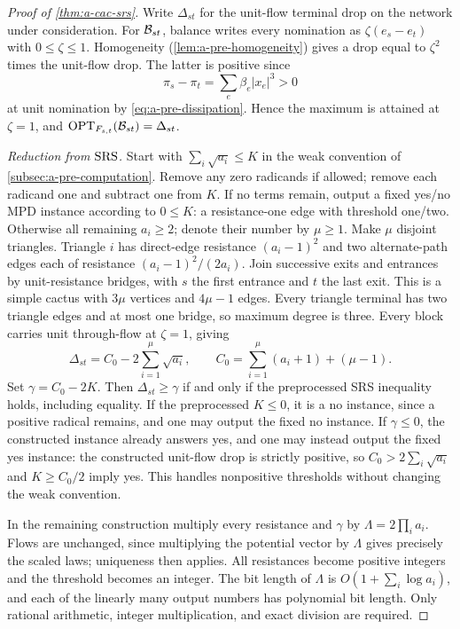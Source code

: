 \begin{proof}[Proof of \cref{thm:a-cac-srs}]
Write $\Delta_{st}$ for the unit-flow terminal drop on the network under
consideration. For $\mathcal{B}_{st}$, balance writes every nomination
as $\zeta(e_s-e_t)$ with $0\le \zeta\le1$. Homogeneity
(\cref{lem:a-pre-homogeneity}) gives a drop equal to $\zeta^2$ times the
unit-flow drop. The latter is positive since
\[
 \pi_s-\pi_t=\sum_e\beta_e|x_e|^3>0
\]
at unit nomination by \cref{eq:a-pre-dissipation}. Hence the maximum
is attained at $\zeta=1$, and
$\mathrm{OPT}_{F_{s,t}}(\mathcal{B}_{st})=\Delta_{st}$.

\emph{Reduction from $\mathrm{SRS}$.}
Start with $\sum_i\sqrt{a_i}\le K$ in the weak convention of
\cref{subsec:a-pre-computation}. Remove any zero radicands if allowed;
remove each radicand one and subtract one from $K$. If no terms
remain, output a fixed yes/no MPD instance according to $0\le K$:
a resistance-one edge with threshold one/two. Otherwise all remaining
$a_i\ge2$; denote their number by $\mu\ge1$. Make $\mu$ disjoint triangles.
Triangle $i$ has direct-edge resistance $(a_i-1)^2$ and two
alternate-path edges each of resistance $(a_i-1)^2/(2a_i)$.
Join successive exits and entrances by unit-resistance bridges, with
$s$ the first entrance and $t$ the last exit. This is a simple cactus
with $3\mu$ vertices and $4\mu-1$ edges. Every triangle terminal has two
triangle edges and at most one bridge, so maximum degree is three.
Every block carries unit through-flow at $\zeta=1$, giving
\[
 \Delta_{st}=C_0-2\sum_{i=1}^\mu\sqrt{a_i},\qquad
 C_0=\sum_{i=1}^\mu(a_i+1)+(\mu-1).
\]
Set $\gamma=C_0-2K$. Then $\Delta_{st}\ge\gamma$ if and only if the
preprocessed SRS inequality holds, including equality. If the
preprocessed $K\le0$, it is a no instance, since a positive radical
remains, and one may output the fixed no instance. If $\gamma\le0$,
the constructed instance already answers yes, and one may instead
output the fixed yes instance: the constructed unit-flow drop
is strictly positive, so $C_0>2\sum_i\sqrt{a_i}$ and $K\ge C_0/2$ imply yes.
This handles nonpositive thresholds without changing the weak convention.

In the remaining construction multiply every resistance and $\gamma$
by $\Lambda=2\prod_i a_i$. Flows are unchanged, since multiplying the
potential vector by $\Lambda$ gives precisely the scaled laws; uniqueness
then applies. All resistances become positive integers and the threshold
becomes an integer. The bit length of $\Lambda$ is
$O(1+\sum_i\log a_i)$, and each of the linearly many output numbers
has polynomial bit length. Only rational arithmetic, integer
multiplication, and exact division are required.


\end{proof}
